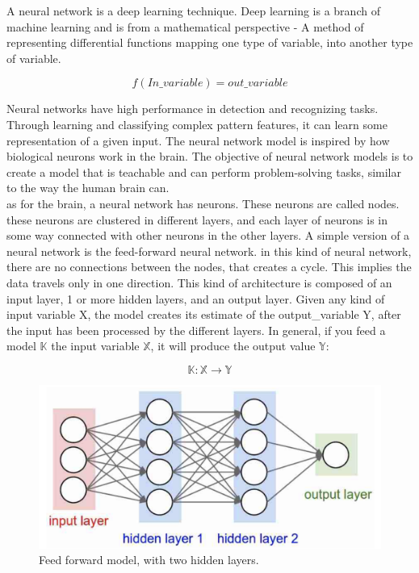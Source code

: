 A neural network is a deep learning technique. Deep learning is a branch of machine learning and is from a mathematical perspective - A method of representing differential functions mapping one type of variable, into another type of variable.

$$
f(In\_variable) = out\_variable
$$

\noindent
Neural networks have high performance in detection and recognizing tasks. Through learning and classifying complex pattern features, it can learn some representation of a given input. The neural network model is inspired by how biological neurons work in the brain. The objective of neural network models is to create a model that is teachable and can perform problem-solving tasks, similar to the way the human brain can.\\

\noindent
as for the brain, a neural network has neurons. These neurons are called nodes. these neurons are clustered in different layers, and each layer of neurons is in some way connected with other neurons in the other layers.  A simple version of a neural network is the feed-forward neural network. in this kind of neural network, there are no connections between the nodes, that creates a cycle. This implies the data travels only in one direction. This kind of architecture is composed of an input layer, 1 or more hidden layers, and an output layer. Given any kind of input variable X, the model creates its estimate of the output\_variable Y, after the input has been processed by the different layers.
In general, if you feed a model $\mathbb{K}$ the input variable $\mathbb{X}$, it will produce the output value $\mathbb{Y}:$

$$
\mathbb{K}: \mathbb{X} \to \mathbb{Y}
$$

\begin{figure}[!ht]
  \centering
  \includegraphics[scale=0.4]{latex/NN.png}
  \caption{Feed forward model, with two hidden layers.}\label{Baseline:before}
\end{figure}

